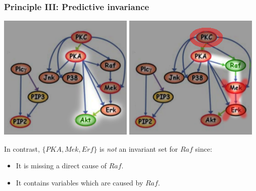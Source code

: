\documentclass{beamer}
\begin{document}
\begin{frame}
\frametitle{Principle III: Predictive invariance}
\begin{center}
\includegraphics[scale = 0.5]{../images/fig04_01.png}\hspace{0.5in}
\includegraphics[scale = 0.5]{../images/fig05_02.png}
\end{center}

In contrast, $\{PKA, Mek, Erf\}$ is \emph{not} an invariant set for $Raf$ since:

\begin{itemize}
\item It is missing a direct cause of $Raf$.
\item It contains variables which are caused by $Raf$.
\end{itemize}

\end{frame}
\end{document}
